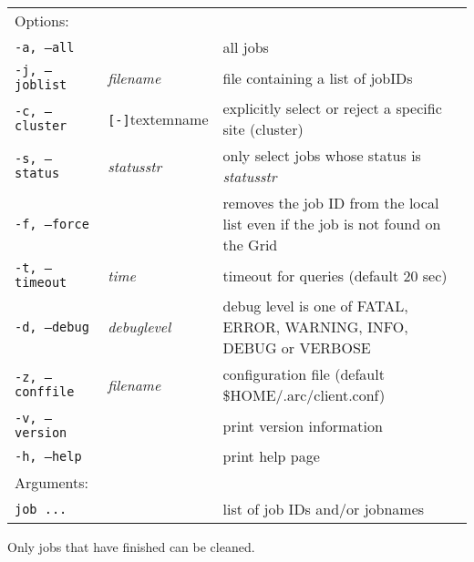 \hspace*{0.5cm}
\begin{shaded}
\end{shaded}
\begin{longtable}{llp{8cm}}
   Options:&&\\
   \texttt{-a, --all}& & all jobs\\
   \texttt{-j, --joblist}& \textit{filename} & file containing a list of jobIDs\\
   \texttt{-c, --cluster}&\verb#[-]#textem{name}&explicitly select or reject a specific site (cluster)\\
   \texttt{-s, --status}& \textit{statusstr} &only select jobs whose status is \textit{statusstr}\\
   \texttt{-f, --force} & & removes the job ID from the local list even if the job is not found on the Grid\\
   \texttt{-t, --timeout}& \textit{time} & timeout for queries (default 20 sec)\\
   \texttt{-d, --debug}& \textit{debuglevel}&debug level is one of  FATAL, ERROR, WARNING, INFO, DEBUG or VERBOSE\\
   \texttt{-z, --conffile}&\textit{filename}& configuration file (default {\$}HOME/.arc/client.conf)\\
   \texttt{-v, --version}& & print version information\\
   \texttt{-h, --help}& & print help page\\
   Arguments:&&\\
   \texttt{job ...} && list of job IDs and/or jobnames\\
\end{longtable}

Only jobs that have finished can be cleaned.

